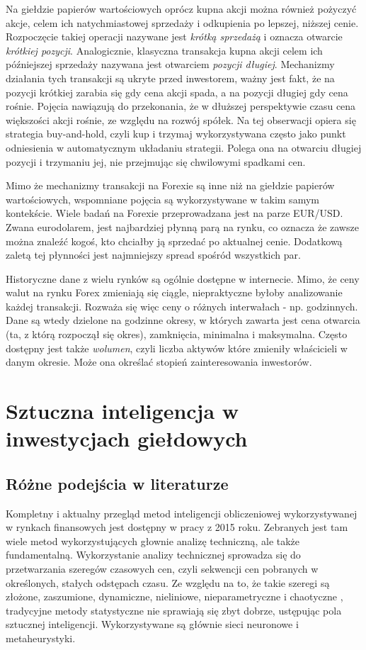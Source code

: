 \documentclass[twoside]{iisthesis}
\begin{document}
Na giełdzie papierów wartościowych oprócz kupna akcji można również pożyczyć akcje, celem ich natychmiastowej sprzedaży i odkupienia po lepszej, niższej cenie. Rozpoczęcie takiej operacji nazywane jest \textit{krótką sprzedażą} i oznacza otwarcie \textit{krótkiej pozycji}. Analogicznie, klasyczna transakcja kupna akcji celem ich późniejszej sprzedaży nazywana jest otwarciem \textit{pozycji długiej}. Mechanizmy działania tych transakcji są ukryte przed inwestorem, ważny jest fakt, że na pozycji krótkiej zarabia się gdy cena akcji spada, a na pozycji długiej gdy cena rośnie. Pojęcia nawiązują do przekonania, że w dłuższej perspektywie czasu cena większości akcji rośnie, ze względu na rozwój spółek. Na tej obserwacji opiera się strategia buy-and-hold, czyli kup i trzymaj wykorzystywana często jako punkt odniesienia w automatycznym układaniu strategii. Polega ona na otwarciu długiej pozycji i trzymaniu jej, nie przejmując się chwilowymi spadkami cen.

Mimo że mechanizmy transakcji na Forexie są inne niż na giełdzie papierów wartościowych, wspomniane pojęcia są wykorzystywane w takim samym kontekście. Wiele badań na Forexie przeprowadzana jest na parze EUR/USD. Zwana eurodolarem, jest najbardziej płynną parą na rynku, co oznacza że zawsze można znaleźć kogoś, kto chciałby ją sprzedać po aktualnej cenie. Dodatkową zaletą tej płynności jest najmniejszy spread spośród wszystkich par.

Historyczne dane z wielu rynków są ogólnie dostępne w internecie. Mimo, że ceny walut na rynku Forex zmieniają się ciągle, niepraktyczne byłoby analizowanie każdej transakcji. Rozważa się więc ceny o różnych interwałach - np. godzinnych. Dane są wtedy dzielone na godzinne okresy, w których zawarta jest cena otwarcia (ta, z którą rozpoczął się okres), zamknięcia, minimalna i maksymalna. Często dostępny jest także \textit{wolumen}, czyli liczba aktywów które zmieniły właścicieli w danym okresie. Może ona określać stopień zainteresowania inwestorów.



\chapter{Sztuczna inteligencja w inwestycjach giełdowych}

\section{Różne podejścia w literaturze}
Kompletny i aktualny przegląd metod inteligencji obliczeniowej wykorzystywanej w rynkach finansowych jest dostępny w pracy \cite{Cavalcante2016194} z 2015 roku. Zebranych jest tam wiele metod wykorzystujących głownie analizę techniczną, ale także fundamentalną. Wykorzystanie analizy technicznej sprowadza się do przetwarzania szeregów czasowych cen, czyli sekwencji cen pobranych w określonych, stałych odstępach czasu. Ze względu na to, że takie szeregi są złożone, zaszumione, dynamiczne, nieliniowe, nieparametryczne i chaotyczne \cite{Si20132581}, tradycyjne metody statystyczne nie sprawiają się zbyt dobrze, ustępując pola sztucznej inteligencji. Wykorzystywane są głównie sieci neuronowe i metaheurystyki.
\end{document}
